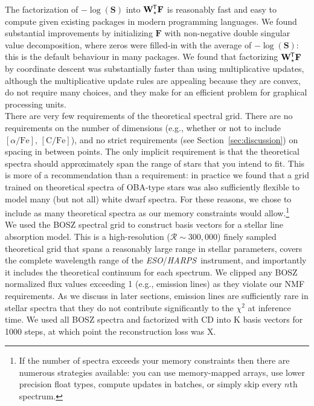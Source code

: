 \documentclass[modern]{aastex631}
\newcommand{\project}[1]{\textit{#1}}
\renewcommand{\vec}[1]{\mathbf{#1}}
\newcommand{\eso}{\project{ESO}}
\newcommand{\harps}{\project{HARPS}}
\newcommand*{\transpose}{^{\mkern-1.5mu\mathsf{T}}}
\newcommand{\todo}[1]{\textcolor{tab:red}{#1}}
\begin{document}
The factorization of $-\log\left({\vec{S}}\right)$ into $\vec{W}_\star\transpose\vec{F}$ is reasonably fast and easy to compute given existing packages in modern programming languages. We found substantial improvements by initializing $\vec{F}$ with non-negative double singular value decomposition, where zeros were filled-in with the average of $-\log\left({\vec{S}}\right)$: this is the default behaviour in many packages. We found that factorizing $\vec{W}_\star\transpose\vec{F}$ by coordinate descent was substantially faster than using multiplicative updates, although the multiplicative update rules are appealing because they are convex, do not require many choices, and they make for an efficient problem for graphical processing units.\\


There are very few requirements of the theoretical spectral grid. There are no requirements on the number of dimensions (e.g., whether or not to include $[\alpha/\mathrm{Fe}]$, $[\mathrm{C/Fe}]$), and no strict requirements (see Section~\ref{sec:discussion}) on spacing in between points. The only implicit requirement is that the theoretical spectra should approximately span the range of stars that you intend to fit. This is more of a recommendation than a requirement: in practice we found that a grid trained on theoretical spectra of OBA-type stars was also sufficiently flexible to model many (but not all) white dwarf spectra. For these reasons, we chose to include as many theoretical spectra as our memory constraints would allow.\footnote{If the number of spectra exceeds your memory constraints then there are numerous strategies available: you can use memory-mapped arrays, use lower precision float types, compute updates in batches, or simply skip every $n$th spectrum.}\\

We used the BOSZ spectral grid to construct basis vectors for a stellar line absorption model. This is a high-resolution ($\mathcal{R} \sim 300{,}000$) finely sampled theoretical grid that spans a reasonably large range in stellar parameters, covers the complete wavelength range of the \eso/\harps\ instrument, and importantly it includes the theoretical continuum for each spectrum. We clipped any BOSZ normalized flux values exceeding 1 (e.g., emission lines) as they violate our NMF requirements. As we discuss in later sections, emission lines are sufficiently rare in stellar spectra that they do not contribute significantly to the $\chi^2$ at inference time. We used \todo{all BOSZ spectra and factorized with CD into K basis vectors for 1000 steps, at which point the reconstruction loss was X}.\\
\end{document}
